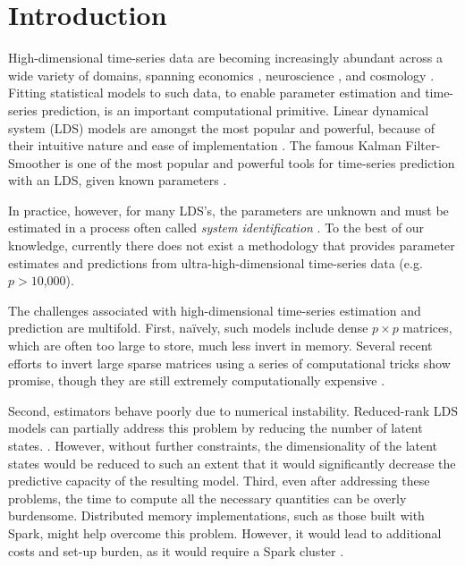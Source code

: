 \documentclass[times,twocolumn,final,authoryear]{elsarticle}
\begin{document}

\section{Introduction}
High-dimensional  time-series data are becoming increasingly  abundant across a wide variety of domains, spanning economics \citep{Johansen1988}, neuroscience \citep{Friston2003a},   and cosmology \citep{Xie2013a}. Fitting statistical models to such data, to enable parameter estimation and time-series prediction, is an important computational primitive.
Linear dynamical system (LDS) models are amongst the most popular and powerful, because of their intuitive nature and ease of implementation \citep{Kalman1963}.   The famous Kalman Filter-Smoother is one of the most popular and powerful tools for time-series prediction with an LDS, given known parameters \citep{Kalman1960a}.

In practice, however, for many LDS's, the parameters are unknown and must be estimated in a process often called \emph{system identification} \citep{Ljung1998}.  To the best of our knowledge, currently there does not exist a methodology that provides parameter estimates and predictions from ultra-high-dimensional time-series data (e.g. $p > 10$,$000$).

The challenges associated with high-dimensional time-series estimation and prediction are multifold.  First, na\"ively, such models include dense $p \times p$ matrices, which are often too large to store, much less invert in memory.  Several recent efforts to invert large sparse matrices using a series of computational tricks show promise, though they are still extremely computationally expensive  \citep{Hsieh2013, Banerjee2013a}.

Second, estimators behave poorly due to numerical instability.
Reduced-rank LDS models can partially address this problem by reducing the number of latent states.  \citep{CHEN1989}.  However, without further constraints, the dimensionality of the latent states would be reduced to such an extent  that it would significantly decrease the predictive capacity of the resulting model.  Third, even after addressing these problems, the time to compute all the necessary quantities can be overly burdensome. Distributed memory implementations, such as those built with Spark, might help overcome this problem. However, it would lead to additional costs and set-up burden, as it would require a Spark cluster \citep{Zaharia2010}.
\end{document}
